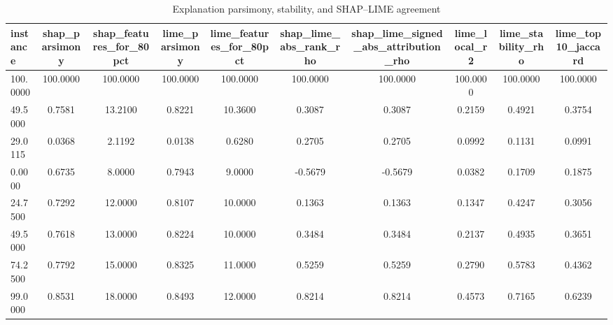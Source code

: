 \begin{table}
\centering
\caption{Explanation parsimony, stability, and SHAP--LIME agreement}
\label{tab:explanation_quality}
\begin{tabular}{lccccccccc}
\toprule
instance & shap_parsimony & shap_features_for_80pct & lime_parsimony & lime_features_for_80pct & shap_lime_abs_rank_rho & shap_lime_signed_abs_attribution_rho & lime_local_r2 & lime_stability_rho & lime_top10_jaccard \\
\midrule
100.0000 & 100.0000 & 100.0000 & 100.0000 & 100.0000 & 100.0000 & 100.0000 & 100.0000 & 100.0000 & 100.0000 \\
49.5000 & 0.7581 & 13.2100 & 0.8221 & 10.3600 & 0.3087 & 0.3087 & 0.2159 & 0.4921 & 0.3754 \\
29.0115 & 0.0368 & 2.1192 & 0.0138 & 0.6280 & 0.2705 & 0.2705 & 0.0992 & 0.1131 & 0.0991 \\
0.0000 & 0.6735 & 8.0000 & 0.7943 & 9.0000 & -0.5679 & -0.5679 & 0.0382 & 0.1709 & 0.1875 \\
24.7500 & 0.7292 & 12.0000 & 0.8107 & 10.0000 & 0.1363 & 0.1363 & 0.1347 & 0.4247 & 0.3056 \\
49.5000 & 0.7618 & 13.0000 & 0.8224 & 10.0000 & 0.3484 & 0.3484 & 0.2137 & 0.4935 & 0.3651 \\
74.2500 & 0.7792 & 15.0000 & 0.8325 & 11.0000 & 0.5259 & 0.5259 & 0.2790 & 0.5783 & 0.4362 \\
99.0000 & 0.8531 & 18.0000 & 0.8493 & 12.0000 & 0.8214 & 0.8214 & 0.4573 & 0.7165 & 0.6239 \\
\bottomrule
\end{tabular}
\end{table}
